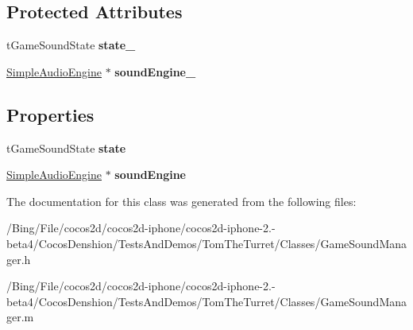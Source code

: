 \subsection*{Protected Attributes}
\begin{DoxyCompactItemize}
\item 
\hypertarget{interface_game_sound_manager_a56dd4789425039acedb7510b3b18655c}{t\-Game\-Sound\-State {\bfseries state\-\_\-}}\label{interface_game_sound_manager_a56dd4789425039acedb7510b3b18655c}

\item 
\hypertarget{interface_game_sound_manager_a5c05b17135c5b648875403ec96f495a4}{\hyperlink{interface_simple_audio_engine}{Simple\-Audio\-Engine} $\ast$ {\bfseries sound\-Engine\-\_\-}}\label{interface_game_sound_manager_a5c05b17135c5b648875403ec96f495a4}

\end{DoxyCompactItemize}
\subsection*{Properties}
\begin{DoxyCompactItemize}
\item 
\hypertarget{interface_game_sound_manager_ad2e83bda3c28e9e42b741f7d3c2e22b0}{t\-Game\-Sound\-State {\bfseries state}}\label{interface_game_sound_manager_ad2e83bda3c28e9e42b741f7d3c2e22b0}

\item 
\hypertarget{interface_game_sound_manager_af0fdf3defff04ba18fb37e38af618cc0}{\hyperlink{interface_simple_audio_engine}{Simple\-Audio\-Engine} $\ast$ {\bfseries sound\-Engine}}\label{interface_game_sound_manager_af0fdf3defff04ba18fb37e38af618cc0}

\end{DoxyCompactItemize}


The documentation for this class was generated from the following files\-:\begin{DoxyCompactItemize}
\item 
/\-Bing/\-File/cocos2d/cocos2d-\/iphone/cocos2d-\/iphone-\/2.-\/beta4/\-Cocos\-Denshion/\-Tests\-And\-Demos/\-Tom\-The\-Turret/\-Classes/Game\-Sound\-Manager.\-h\item 
/\-Bing/\-File/cocos2d/cocos2d-\/iphone/cocos2d-\/iphone-\/2.-\/beta4/\-Cocos\-Denshion/\-Tests\-And\-Demos/\-Tom\-The\-Turret/\-Classes/Game\-Sound\-Manager.\-m\end{DoxyCompactItemize}
